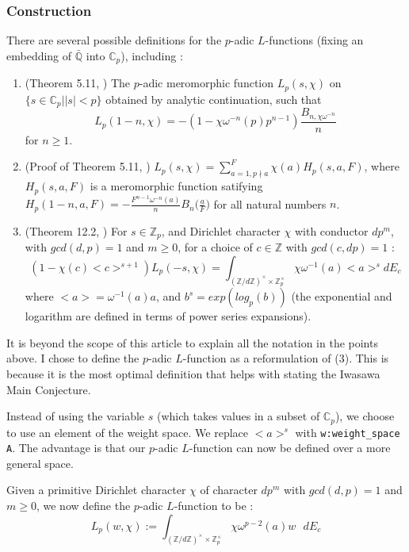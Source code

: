 \documentclass[a4paper,UKenglish,cleveref, autoref, thm-restate]{lipics-v2021}
\newcommand{\lean}[1]{\texttt{#1}\xspace} %
\begin{document}
\subsubsection{Construction}
There are several possible definitions for the $p$-adic $L$-functions (fixing an embedding of
$\mathbb{\bar{\mathbb{Q}}}$ into $\mathbb{C}_p$), including :
\begin{enumerate}{}{}
  \item (Theorem 5.11, \cite{cyc}) The $p$-adic meromorphic function $L_p(s, \chi)$ on
  \newline $\{ s \in \mathbb{C}_p | |s| < p \}$ obtained by analytic continuation, such that
  $$ L_p (1 - n, \chi) = -(1 - \chi \omega^{-n}(p)p^{n - 1}) \frac{B_{n, \chi \omega^{-n}}}{n} $$
  for $n \ge 1$.
  \item (Proof of Theorem 5.11, \cite{cyc})
  $L_p(s, \chi) = \sum_{a = 1, p\nmid a}^F \chi(a)H_p(s, a, F)$, where $H_p (s, a, F)$ is a 
  meromorphic function satifying 
  \newline $H_p(1 - n, a, F) = - \frac{F^{n - 1}\omega^{-n}(a)}{n} B_n \big( \frac{a}{F} \big)$ for all 
  natural numbers $n$.
  \item (Theorem 12.2, \cite{cyc}) For $s \in \mathbb{Z}_p$, and Dirichlet character $\chi$ with
  conductor $d p^m$, with $gcd (d, p) = 1$ and $m \ge 0$, for a choice of $c \in \mathbb{Z}$
  with $gcd (c, dp) = 1$ :
  $$ (1 - \chi(c)<c>^{s+1}) L_p(-s, \chi) = \int_{(\mathbb{Z}/d \mathbb{Z})^{\times} \times \mathbb{Z}_p^{\times}}
  \chi \omega^{-1}(a) <a>^s dE_c $$
  where $<a> = \omega^{-1}(a) a$, and $b^s = exp (log_p (b))$ (the exponential and logarithm are defined in 
  terms of power series expansions).
\end{enumerate}

It is beyond the scope of this article to explain all the notation in the points above. I chose to
define the $p$-adic $L$-function as a reformulation of (3). This is because it is the most optimal
definition that helps with stating the Iwasawa Main Conjecture. 

Instead of using the variable $s$ (which takes values in a subset of $\mathbb{C}_p$), we choose to use an element of the weight space. We replace
$<a>^s$ with \lean{w:weight\_space A}. The advantage is that our $p$-adic $L$-function can now be defined over a more general space. 

Given a primitive Dirichlet character $\chi$ of character $dp^m$ with $gcd(d, p) = 1$ and $m \ge 0$,
we now define the $p$-adic $L$-function to be :
$$ L_p(w, \chi) := \int_{(\mathbb{Z}/d \mathbb{Z})^{\times} \times \mathbb{Z}_p^{\times}}
\chi \omega^{p - 2} (a) w \text{    } dE_c $$
\end{document}
